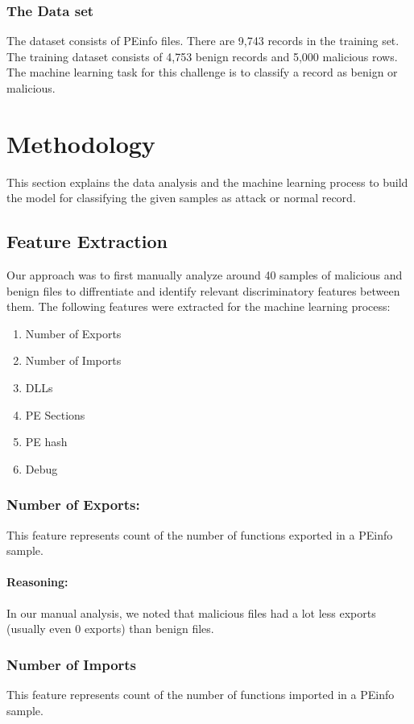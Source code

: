 \documentclass{llncs}
\begin{document}
\subsubsection{The Data set}
The dataset consists of PEinfo files. There are 9,743 records in the training set. The training dataset consists of 4,753 benign records and 5,000 malicious rows. The machine learning task for this challenge is to classify a record as benign or malicious.

\section{Methodology}
This section explains the data analysis and the machine learning process to build the model for classifying the given samples as attack  or normal record. 

\subsection{Feature Extraction}
Our approach was to first manually analyze around 40 samples of malicious and benign files to diffrentiate and identify relevant discriminatory features between them. The following features were extracted for the machine learning process:
\begin{enumerate}
	\item Number of Exports
	\item Number of Imports
	\item DLLs 
	\item PE Sections
	\item PE hash
	\item Debug
\end{enumerate}

\subsubsection{Number of Exports:}
This feature represents count of the number of functions exported in a PEinfo sample. 
\paragraph{Reasoning:}
In our manual analysis, we noted that malicious files had a lot less exports (usually even 0 exports) than benign files.

\subsubsection{Number of Imports}
This feature represents count of the number of functions imported in a PEinfo sample. 
\end{document}

